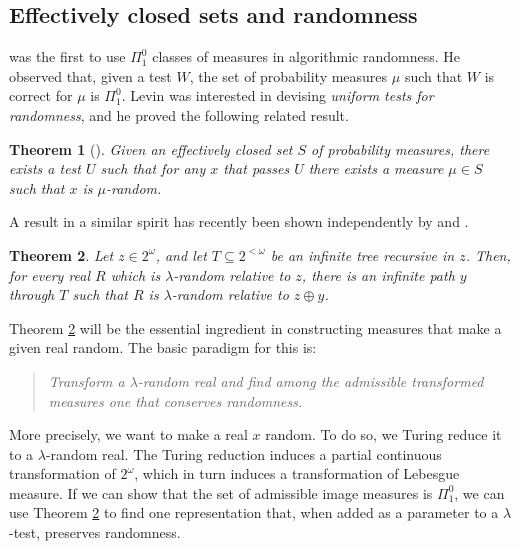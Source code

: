 \documentclass[11pt,reqno]{article}
\theoremstyle{plain}
\newtheorem{thm}{Theorem}
\theoremstyle{definition}
\theoremstyle{remark}
\numberwithin{equation}{section}
\newcommand{\Cant}{\ensuremath{2^{\omega}}}
\newcommand{\Str}[1][<\omega]{\ensuremath{2^{#1}}}
\newcommand{\Leb}{\ensuremath{\lambda}}
\begin{document}
% 
% 
\subsection{Effectively closed sets and randomness} \label{ssec-closed-rand}

\citet{levin:1973} was the first to use $\Pi^0_1$ classes of measures in algorithmic randomness.
He observed that, given a test $W$, the set of probability measures $\mu$ such that $W$ is correct for $\mu$ is $\Pi^0_1$. Levin was interested in devising \emph{uniform tests for randomness}, and he proved the following related result.
 
\begin{thm}[\citet{levin:1973}]
		Given an effectively closed set $S$ of probability measures, there exists a test $U$ such that for any $x$ that passes $U$ there exists a measure $\mu \in S$ such that $x$ is $\mu$-random.
\end{thm}

A result in a similar spirit has recently been shown independently by \citet{downey-hirschfeldt-miller-nies:2005} and \citet{reimann-slaman:tbs}.

%
%
\begin{thm}\label{thm-rand-conserv-basis}
  Let $z \in \Cant$, and let $T \subseteq \Str$ be an infinite
  tree recursive in $z$. Then, for every real
  $R$ which is $\Leb$-random relative to $z$, there is
  an infinite path $y$ through $T$ such that $R$ is $\Leb$-random relative to $z \oplus y$.
\end{thm} 


Theorem \ref{thm-rand-conserv-basis} will be the essential ingredient in constructing measures that make a given real random. The basic paradigm for this is:
\begin{quote}
	\emph{Transform a $\Leb$-random real  and find among the admissible transformed measures one that conserves randomness.}
\end{quote}
More precisely, we want to make a real $x$ random. To do so, we Turing reduce it to a $\Leb$-random real. The Turing reduction induces a partial continuous transformation of $\Cant$, which in turn induces a transformation of Lebesgue measure. If we can show that the set of admissible image measures is $\Pi^0_1$, we can use Theorem \ref{thm-rand-conserv-basis} to find one representation that, when added as a parameter to a $\Leb$-test, preserves randomness. 
\end{document}
